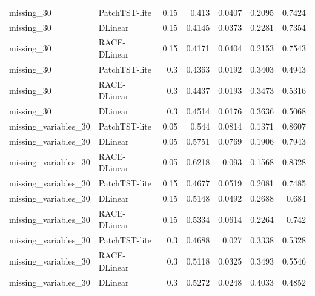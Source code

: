 \begin{table}[t]
{\begin{tabular}{llrrrrr}
missing\_30 & PatchTST-lite & 0.15 & 0.413 & 0.0407 & 0.2095 & 0.7424 \\
missing\_30 & DLinear & 0.15 & 0.4145 & 0.0373 & 0.2281 & 0.7354 \\
missing\_30 & RACE-DLinear & 0.15 & 0.4171 & 0.0404 & 0.2153 & 0.7543 \\
missing\_30 & PatchTST-lite & 0.3 & 0.4363 & 0.0192 & 0.3403 & 0.4943 \\
missing\_30 & RACE-DLinear & 0.3 & 0.4437 & 0.0193 & 0.3473 & 0.5316 \\
missing\_30 & DLinear & 0.3 & 0.4514 & 0.0176 & 0.3636 & 0.5068 \\
missing\_variables\_30 & PatchTST-lite & 0.05 & 0.544 & 0.0814 & 0.1371 & 0.8607 \\
missing\_variables\_30 & DLinear & 0.05 & 0.5751 & 0.0769 & 0.1906 & 0.7943 \\
missing\_variables\_30 & RACE-DLinear & 0.05 & 0.6218 & 0.093 & 0.1568 & 0.8328 \\
missing\_variables\_30 & PatchTST-lite & 0.15 & 0.4677 & 0.0519 & 0.2081 & 0.7485 \\
missing\_variables\_30 & DLinear & 0.15 & 0.5148 & 0.0492 & 0.2688 & 0.684 \\
missing\_variables\_30 & RACE-DLinear & 0.15 & 0.5334 & 0.0614 & 0.2264 & 0.742 \\
missing\_variables\_30 & PatchTST-lite & 0.3 & 0.4688 & 0.027 & 0.3338 & 0.5328 \\
missing\_variables\_30 & RACE-DLinear & 0.3 & 0.5118 & 0.0325 & 0.3493 & 0.5546 \\
missing\_variables\_30 & DLinear & 0.3 & 0.5272 & 0.0248 & 0.4033 & 0.4852 \\
\bottomrule
\end{tabular}
}
\end{table}
